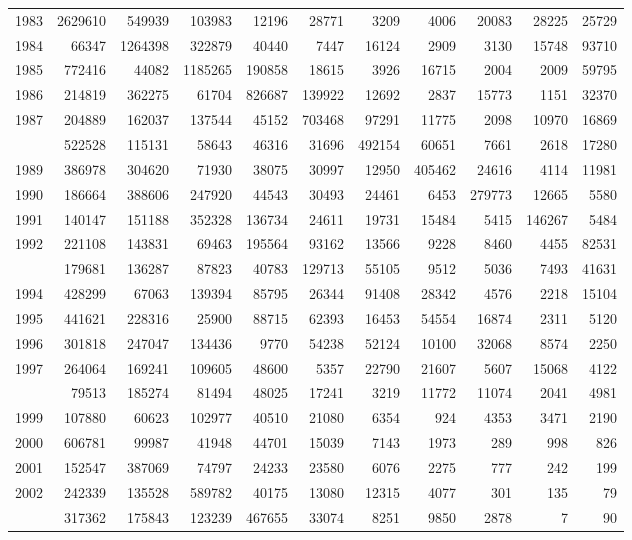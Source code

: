 \documentclass[
]{article}
\begin{document}
\begin{longtable}[t]{lrrrrrrrrrr}
1983 & 2629610 & 549939 & 103983 & 12196 & 28771 & 3209 & 4006 & 20083 & 28225 & 25729\\
1984 & 66347 & 1264398 & 322879 & 40440 & 7447 & 16124 & 2909 & 3130 & 15748 & 93710\\
1985 & 772416 & 44082 & 1185265 & 190858 & 18615 & 3926 & 16715 & 2004 & 2009 & 59795\\
1986 & 214819 & 362275 & 61704 & 826687 & 139922 & 12692 & 2837 & 15773 & 1151 & 32370\\
1987 & 204889 & 162037 & 137544 & 45152 & 703468 & 97291 & 11775 & 2098 & 10970 & 16869\\
\addlinespace
1988 & 522528 & 115131 & 58643 & 46316 & 31696 & 492154 & 60651 & 7661 & 2618 & 17280\\
1989 & 386978 & 304620 & 71930 & 38075 & 30997 & 12950 & 405462 & 24616 & 4114 & 11981\\
1990 & 186664 & 388606 & 247920 & 44543 & 30493 & 24461 & 6453 & 279773 & 12665 & 5580\\
1991 & 140147 & 151188 & 352328 & 136734 & 24611 & 19731 & 15484 & 5415 & 146267 & 5484\\
1992 & 221108 & 143831 & 69463 & 195564 & 93162 & 13566 & 9228 & 8460 & 4455 & 82531\\
\addlinespace
1993 & 179681 & 136287 & 87823 & 40783 & 129713 & 55105 & 9512 & 5036 & 7493 & 41631\\
1994 & 428299 & 67063 & 139394 & 85795 & 26344 & 91408 & 28342 & 4576 & 2218 & 15104\\
1995 & 441621 & 228316 & 25900 & 88715 & 62393 & 16453 & 54554 & 16874 & 2311 & 5120\\
1996 & 301818 & 247047 & 134436 & 9770 & 54238 & 52124 & 10100 & 32068 & 8574 & 2250\\
1997 & 264064 & 169241 & 109605 & 48600 & 5357 & 22790 & 21607 & 5607 & 15068 & 4122\\
\addlinespace
1998 & 79513 & 185274 & 81494 & 48025 & 17241 & 3219 & 11772 & 11074 & 2041 & 4981\\
1999 & 107880 & 60623 & 102977 & 40510 & 21080 & 6354 & 924 & 4353 & 3471 & 2190\\
2000 & 606781 & 99987 & 41948 & 44701 & 15039 & 7143 & 1973 & 289 & 998 & 826\\
2001 & 152547 & 387069 & 74797 & 24233 & 23580 & 6076 & 2275 & 777 & 242 & 199\\
2002 & 242339 & 135528 & 589782 & 40175 & 13080 & 12315 & 4077 & 301 & 135 & 79\\
\addlinespace
2003 & 317362 & 175843 & 123239 & 467655 & 33074 & 8251 & 9850 & 2878 & 7 & 90\\

\end{longtable}
\end{document}

